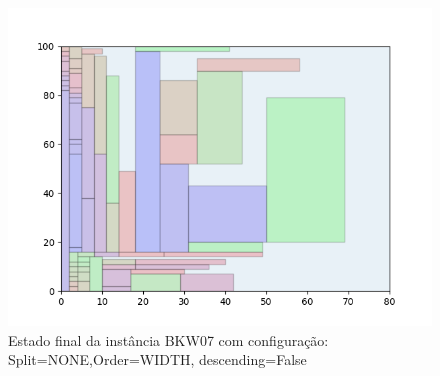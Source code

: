 \begin{figure}[H]
    \centering
    \caption[]{Estado final da instância BKW07 com configuração: Split=NONE,Order=WIDTH, descending=False}
    \label{fig:bkw07-none-width-false}
    \includegraphics[scale=0.5]{output/figures/bkw/bkw07/none/width/false/00}
\end{figure}